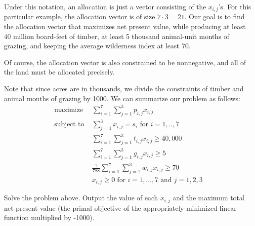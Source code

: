 Under this notation, an allocation is just a vector consisting of the $x_{i,j}$'s. For this particular
example, the allocation vector is of size $7\cdot 3 = 21$. 
Our goal is to find the allocation vector that maximizes net present value, while producing at least 40 million
board-feet of timber, at least 5 thousand animal-unit months of grazing, and keeping the average wilderness index at least 70.

Of course, the allocation vector is also constrained to be nonnegative, and all of the land must be allocated 
precisely. 

Note that since acres are in thousands, we divide the constraints of timber and animal months of grazing by 1000. We can summarize our problem as follows:
\begin{align*}
\text{maximize } &\sum\limits_{i=1}^7 \sum\limits_{j=1}^3 p_{i,j}x_{i,j} \\
\text{subject to } &\sum\limits_{j=1}^3 x_{i,j} = s_i  \text{ for } i=1,..,7 \\
	        &\sum\limits_{i=1}^7 \sum\limits_{j=1}^3 t_{i,j}x_{i,j} \geq 40,000 \\
		&\sum\limits_{i=1}^7 \sum\limits_{j=1}^3 g_{i,j}x_{i,j} \geq 5 \\
		&\frac{1}{788} \sum\limits_{i=1}^7 \sum\limits_{j=1}^3 w_{i,j}x_{i,j} \geq 70 \\
		&x_{i,j} \geq 0 \text{ for } i=1,...,7  \text{ and } j=1,2,3
\end{align*}

\begin{problem}
Solve the problem above. Output the value of each $x_{i,j}$ and the maximum total net present value (the primal objective of the appropriately minimized linear function multiplied by -1000).
\end{problem} 
